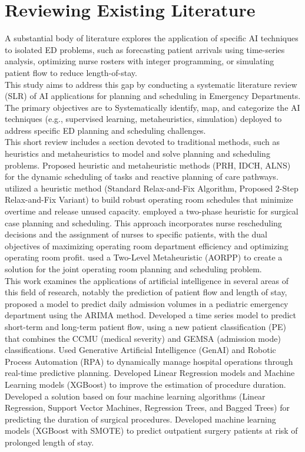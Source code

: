 \documentclass[runningheads]{llncs}
\begin{document}
\section{Reviewing Existing Literature}
A substantial body of literature explores the application of specific AI techniques to isolated ED problems, such as forecasting patient arrivals using time-series analysis, optimizing nurse rosters with integer programming, or simulating patient flow to reduce length-of-stay.\\
This study aims to address this gap by conducting a systematic literature review (SLR) of AI applications for planning and scheduling in Emergency Departments. The primary objectives are to Systematically identify, map, and categorize the AI techniques (e.g., supervised learning, metaheuristics, simulation) deployed to address specific ED planning and scheduling challenges.\\
This short review includes a section devoted to traditional methods, such as heuristics and metaheuristics to model and solve planning and scheduling problems. \cite{mezouari2023thesis} Proposed heuristic and metaheuristic methods (PRH, IDCH, ALNS) for the dynamic scheduling of tasks and reactive planning of care pathways. \cite{kroer2018or} utilized a heuristic method (Standard Relax-and-Fix Algorithm, Proposed 2-Step Relax-and-Fix Variant) to build robust operating room schedules that minimize overtime and release unused capacity. \cite{akbarzadeh2020or}  employed a two-phase heuristic for surgical case planning and scheduling. This approach incorporates nurse rescheduling decisions and the assignment of nurses to specific patients, with the dual objectives of maximizing operating room department efficiency and optimizing operating room profit. \cite{aringhieri2015metaheuristic} used a Two-Level Metaheuristic (AORPP) to create a solution for the joint operating room planning and scheduling problem.\\
This work examines the applications of artificial intelligence in several areas of this field of research, notably the prediction of patient flow and length of stay, \cite{kadri2014ed} proposed a model to predict daily admission volumes in a pediatric emergency department using the ARIMA method. \cite{afilal2016edflow} Developed a time series model to predict short-term and long-term patient flow, using a new patient classification (PE) that combines the CCMU (medical severity) and GEMSA (admission mode) classifications. \cite{chennupati2025aira} Used Generative Artificial Intelligence (GenAI) and Robotic Process Automation (RPA) to dynamically manage hospital operations through real-time predictive planning. \cite{bartek2019ml} Developed Linear Regression models and Machine Learning models (XGBoost) to improve the estimation of procedure duration. \cite{martinez2021surgical} Developed a solution based on four machine learning algorithms (Linear Regression, Support Vector Machines, Regression Trees, and Bagged Trees) for predicting the duration of surgical procedures. \cite{jeffrey2023los} Developed machine learning models (XGBoost with SMOTE) to predict outpatient surgery patients at risk of prolonged length of stay.\\ 
\end{document}

